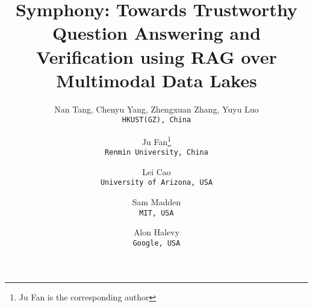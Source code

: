 \documentclass[11pt]{article}
\begin{document}
\title{Symphony: Towards Trustworthy Question Answering and Verification using RAG over Multimodal Data Lakes}


\author{
  Nan Tang, Chenyu Yang, Zhengxuan Zhang, Yuyu Luo\\
  \texttt{HKUST(GZ), China}\\
  \and
  Ju Fan\thanks{Ju Fan is the corresponding author}\\
  \texttt{Renmin University, China}\\
  \and 
  Lei Cao\\
  \texttt{University of Arizona, USA}\\
  \and
  Sam Madden\\
  \texttt{MIT, USA}\\
  \and 
  Alon Halevy\\
  \texttt{Google, USA}
}

\maketitle



% 
%










  
\end{document}
